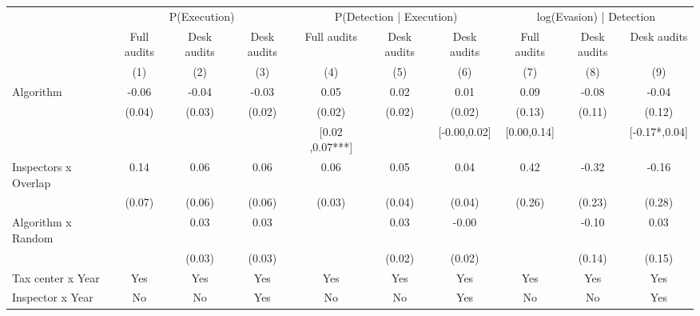 \begin{tabular}{lccc|ccc|ccc} \toprule
\multicolumn{1}{l}{} & \multicolumn{3}{c}{P(Execution)} & \multicolumn{3}{c}{P(Detection | Execution)} & \multicolumn{3}{c}{log(Evasion) | Detection} \\\cmidrule(lr){2-4}\cmidrule(lr){5-7}\cmidrule(lr){8-10} \multicolumn{1}{l}{} & Full audits & Desk audits & Desk audits & Full audits & Desk audits & Desk audits & Full audits & Desk audits & Desk audits \\ \multicolumn{1}{l}{} & (1) & (2) & (3) & (4) & (5) & (6) & (7) & (8) & (9) \\ \midrule
Algorithm   &       -0.06\sym{*}  &       -0.04\sym{*}  &       -0.03         &        0.05\sym{**} &        0.02         &        0.01         &        0.09         &       -0.08         &       -0.04         \\
            &      (0.04)         &      (0.03)         &      (0.02)         &      (0.02)         &      (0.02)         &      (0.02)         &      (0.13)         &      (0.11)         &      (0.12)         \\
\addlinespace
 & & & & [0.02 ,0.07***] & & [-0.00,0.02] & [0.00,0.14] & & [-0.17*,0.04] \\  Inspectors x Overlap&        0.14\sym{*}  &        0.06         &        0.06         &        0.06         &        0.05         &        0.04         &        0.42         &       -0.32         &       -0.16         \\
            &      (0.07)         &      (0.06)         &      (0.06)         &      (0.03)         &      (0.04)         &      (0.04)         &      (0.26)         &      (0.23)         &      (0.28)         \\
\addlinespace
Algorithm x Random&                     &        0.03         &        0.03         &                     &        0.03         &       -0.00         &                     &       -0.10         &        0.03         \\
            &                     &      (0.03)         &      (0.03)         &                     &      (0.02)         &      (0.02)         &                     &      (0.14)         &      (0.15)         \\
\midrule
Tax center x Year&         Yes         &         Yes         &         Yes         &         Yes         &         Yes         &         Yes         &         Yes         &         Yes         &         Yes         \\
Inspector x Year&          No         &          No         &         Yes         &          No         &          No         &         Yes         &          No         &          No         &         Yes         \\

\end{tabular}
